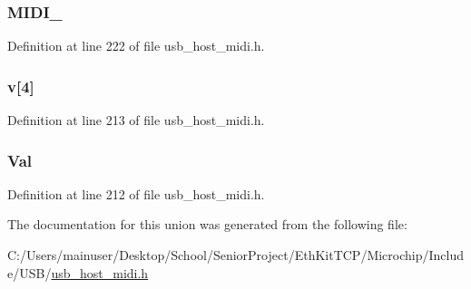 \subsubsection[{M\+I\+D\+I\+\_\+2}]{ M\+I\+D\+I\+\_}\label{union_u_s_b___a_u_d_i_o___m_i_d_i___p_a_c_k_e_t_a39e3944f07fa87426fb9687f22e268d3}


Definition at line 222 of file usb\+\_\+host\+\_\+midi.\+h.

\hypertarget{union_u_s_b___a_u_d_i_o___m_i_d_i___p_a_c_k_e_t_a6a8b1b6abca9b51faec40b33d22aed79}{}
\subsubsection[{v}]{ v\mbox{[}4\mbox{]}}\label{union_u_s_b___a_u_d_i_o___m_i_d_i___p_a_c_k_e_t_a6a8b1b6abca9b51faec40b33d22aed79}


Definition at line 213 of file usb\+\_\+host\+\_\+midi.\+h.

\hypertarget{union_u_s_b___a_u_d_i_o___m_i_d_i___p_a_c_k_e_t_a1a2aefd22f32fe19c7a40fd62958b591}{}
\subsubsection[{Val}]{ Val}\label{union_u_s_b___a_u_d_i_o___m_i_d_i___p_a_c_k_e_t_a1a2aefd22f32fe19c7a40fd62958b591}


Definition at line 212 of file usb\+\_\+host\+\_\+midi.\+h.



The documentation for this union was generated from the following file\+:\begin{DoxyCompactItemize}
\item 
C\+:/\+Users/mainuser/\+Desktop/\+School/\+Senior\+Project/\+Eth\+Kit\+T\+C\+P/\+Microchip/\+Include/\+U\+S\+B/\hyperlink{usb__host__midi_8h}{usb\+\_\+host\+\_\+midi.\+h}\end{DoxyCompactItemize}
